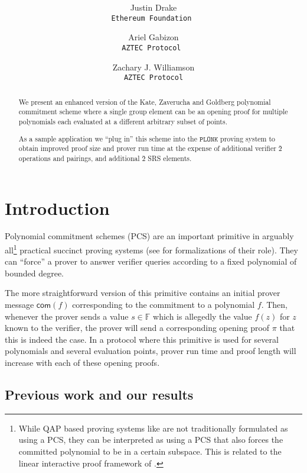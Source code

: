 \documentclass[11pt]{article} %
\title{ \bf \papertitle \\[0.72cm]}
\author{Justin Drake \\ \tt{Ethereum Foundation} \and  Ariel Gabizon\\ \tt{AZTEC Protocol}  \and Zachary J. Williamson\\ \tt{AZTEC Protocol}}
\newcommand{\F}{\ensuremath{\mathbb F}\xspace}
\newcommand{\com}{\ensuremath{\mathsf{com}}\xspace}
\newcommand{\plonk}{\ensuremath{\mathtt{PLONK}}\xspace}
\begin{document}
    \maketitle

\begin{abstract}
We present an enhanced version of the Kate, Zaverucha and Goldberg polynomial commitment scheme \cite{kate} where a single group element can be an opening proof for multiple polynomials each evaluated at a different arbitrary subset of points.



As a sample application we ``plug in'' this scheme into the \plonk proving system\cite{plonk} to obtain improved proof size and prover run time at the expense of additional verifier \G2 operations and pairings,  and additional \G2 SRS elements.
\end{abstract}

\section{Introduction}

Polynomial commitment schemes (PCS) are an important primitive in arguably all\footnote{While QAP based proving systems like \cite{pinocchio,groth16} are not traditionally formulated as using a PCS, they can be interpreted as using a PCS that also forces the committed polynomial to be in a certain subspace. This is related to the linear interactive proof framework of  \cite{bciop}.} practical succinct proving systems (see \cite{marlin,plonk,supersonic} for formalizations of their role).  They can ``force'' a prover to answer verifier queries according to a fixed polynomial of bounded degree.

The more straightforward version of this primitive contains an initial prover message $\com(f)$ corresponding to the commitment to a polynomial $f$. Then, whenever the prover sends a value $s\in \F$ which is allegedly the value $f(z)$ for $z$ known to the verifier, the prover will send a corresponding opening proof $\pi$ that this is indeed the case. In a protocol where this primitive is used for several polynomials and several evaluation points, prover run time and proof length will increase with each of these opening proofs.



\subsection{Previous work and our results}
\end{document}

